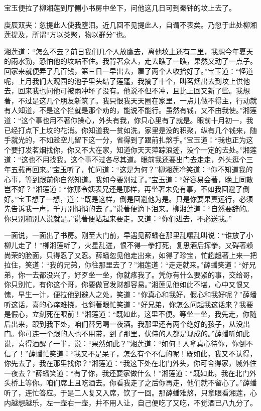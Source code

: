 \begin{parag}
    宝玉便拉了柳湘莲到厅侧小书房中坐下，问他这几日可到秦钟的坟上去了。\begin{note}庚辰双夹：忽提此人使我堕泪。近几回不见提此人，自谓不表矣。乃忽于此处柳湘莲提及，所谓“方以类聚，物以群分”也。\end{note}湘莲道：“怎么不去？前日我们几个人放鹰去，离他坟上还有二里，我想今年夏天的雨水勤，恐怕他的坟站不住。我背著众人，走去瞧了一瞧，果然又动了一点子。回家来就便弄了几百钱，第三日一早出去，雇了两个人收拾好了。”宝玉道：“怪道呢，上月我们大观园的池子里头结了莲蓬，我摘了十个，叫茗烟出去到坟上供他去，回来我也问他可被雨冲坏了没有。他说不但不冲，且比上回又新了些。我想著，不过是这几个朋友新筑了。我只恨我天天圈在家里，一点儿做不得主，行动就有人知道，不是这个拦就是那个劝的，能说不能行。虽然有钱，又不由我使。”湘莲道：“这个事也用不著你操心，外头有我，你只心里有了就是。眼前十月初一，我已经打点下上坟的花消。你知道我一贫如洗，家里是没的积聚，纵有几个钱来，随手就光的，不如趁空儿留下这一分，省得到了跟前扎煞手。”宝玉道：“我也正为这个要打发茗烟找你，你又不大在家，知道你天天萍踪浪迹，没个一定的去处。”湘莲道：“这也不用找我。这个事不过各尽其道。眼前我还要出门去走走，外头逛个三年五载再回来。”宝玉听了，忙问道：“这是为何？”柳湘莲冷笑道：“你不知道我的心事，等到跟前你自然知道。我如今要别过了。”宝玉道：“好容易会著，晚上同散岂不好？”湘莲道：“你那令姨表兄还是那样，再坐著未免有事，不如我回避了倒好。”宝玉想了一想，道：“既是这样，倒是回避他为是。只是你要果真远行，必须先告诉我一声，千万别悄悄的去了。”说著便滴下泪来。柳湘莲道：“自然要辞的。你只别和别人说就是。”说著便站起来要走，又道：“你们进去，不必送我。”
\end{parag}


\begin{parag}
    一面说，一面出了书房。刚至大门前，早遇见薛蟠在那里乱嚷乱叫说：“谁放了小柳儿走了！”柳湘莲听了，火星乱迸，恨不得一拳打死，复思酒后挥拳，又碍著赖尚荣的脸面，只得忍了又忍。薛蟠忽见他走出来，如得了珍宝，忙趔趄著上来一把拉住，笑道：“我的兄弟，你往那里去了？”湘莲道：“走走就来。”薛蟠笑道：“好兄弟，你一去都没兴了，好歹坐一坐，你就疼我了。凭你有什么要紧的事，交给哥，你只别忙，有你这个哥，你要做官发财都容易。”湘莲见他如此不堪，心中又恨又愧，早生一计，便拉他到避人之处，笑道：“你真心和我好，假心和我好呢？”薛蟠听这话，喜的心痒难挠，乜斜著眼忙笑道：“好兄弟，你怎么问起我这话来？我要是假心，立刻死在眼前！”湘莲道：“既如此，这里不便。等坐一坐，我先走，你随后出来，跟到我下处，咱们替另喝一夜酒。我那里还有两个绝好的孩子，从没出门。你可连一个跟的人也不用带，到了那里，伏侍的人都是现成的。”薛蟠听如此说，喜得酒醒了一半，说：“果然如此？”湘莲道：“如何！人拿真心待你，你倒不信了！”薛蟠忙笑道：“我又不是呆子，怎么有个不信的呢！既如此，我又不认得，你先去了，我在那里找你？”湘莲道：“我这下处在北门外头，你可舍得家，城外住一夜去？”薛蟠笑道：“有了你，我还要家做什么！”湘莲道：“既如此，我在北门外头桥上等你。咱们席上且吃酒去。你看我走了之后你再走，他们就不留心了。”薛蟠听了，连忙答应。于是二人复又入席，饮了一回。那薛蟠难熬，只拿眼看湘莲，心内越想越乐，左一壶右一壶，并不用人让，自己便吃了又吃，不觉酒已八九分了。
\end{parag}


